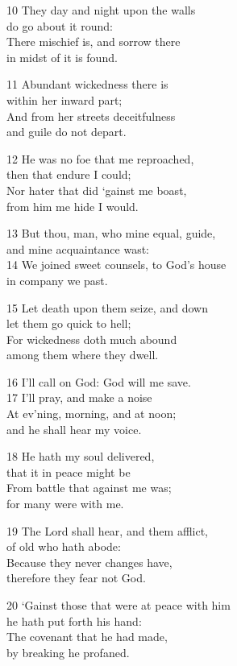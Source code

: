 \begin{multicols}{3}
10 They day and night upon the walls\\
do go about it round:\\
There mischief is, and sorrow there\\
in midst of it is found.

11 Abundant wickedness there is\\
within her inward part;\\
And from her streets deceitfulness\\
and guile do not depart.

12 He was no foe that me reproached,\\
then that endure I could;\\
Nor hater that did ‘gainst me boast,\\
from him me hide I would.

13 But thou, man, who mine equal, guide,\\
and mine acquaintance wast:\\
14 We joined sweet counsels, to God’s house\\
in company we past.

15 Let death upon them seize, and down\\
let them go quick to hell;\\
For wickedness doth much abound\\
among them where they dwell.

16 I’ll call on God: God will me save.\\
17 I’ll pray, and make a noise\\
At ev’ning, morning, and at noon;\\
and he shall hear my voice.

18 He hath my soul delivered,\\
that it in peace might be\\
From battle that against me was;\\
for many were with me.

19 The Lord shall hear, and them afflict,\\
of old who hath abode:\\
Because they never changes have,\\
therefore they fear not God.

20 ‘Gainst those that were at peace with him\\
he hath put forth his hand:\\
The covenant that he had made,\\
by breaking he profaned.


\end{multicols}
